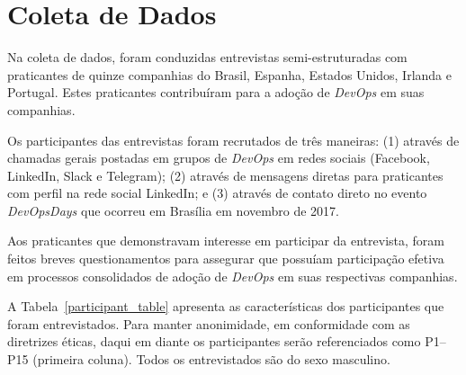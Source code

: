 \section{Coleta de Dados}

Na coleta de dados, foram conduzidas entrevistas semi-estruturadas com praticantes
de quinze companhias do Brasil, Espanha, Estados Unidos, Irlanda e Portugal.
Estes praticantes contribuíram para a adoção de \textit{DevOps} em suas
companhias.

Os participantes das entrevistas foram recrutados de três maneiras: (1) através
de chamadas gerais postadas em grupos de {\it DevOps} em redes sociais
(Facebook, LinkedIn, Slack e Telegram); (2) através de mensagens diretas para
praticantes com perfil na rede social LinkedIn; e (3) através de contato direto
no evento \emph{DevOpsDays} que ocorreu em Brasília em novembro de 2017.

Aos praticantes que demonstravam interesse em participar da entrevista, foram
feitos breves questionamentos para assegurar que possuíam participação efetiva
em processos consolidados de adoção de {\it DevOps} em suas respectivas
companhias.

A Tabela~\ref{participant_table} apresenta as características dos participantes
que foram entrevistados. Para manter anonimidade, em conformidade com as
diretrizes éticas, daqui em diante os participantes serão referenciados como
P1--P15 (primeira coluna). Todos os entrevistados são do sexo masculino.

